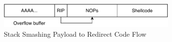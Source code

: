 \begin{figure}[htp!]
    \centering
    \includegraphics[width=0.8\textwidth]{assets/figures/chapter3/payload.pdf}
    \caption{Stack Smashing Payload to Redirect Code Flow}
    \label{fig:stack-smashing-payload}
\end{figure}
